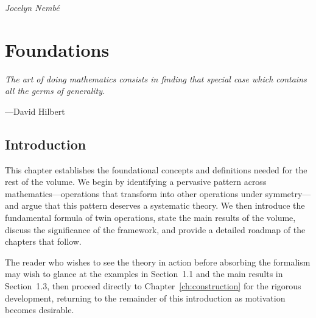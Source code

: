\documentclass[11pt,a4paper,openany]{book}
\theoremstyle{plain}
\theoremstyle{definition}
\begin{document}
\hfill\textit{Jocelyn Nembé}

\vspace{2em}

\part{Foundations}
\label{part:foundations}

\epigraph{\itshape The art of doing mathematics consists in finding that special case which contains all the germs of generality.}{---David Hilbert}


\chapter{Introduction}
\label{ch:introduction}

This chapter establishes the foundational concepts and definitions needed for the rest of the volume. We begin by identifying a pervasive pattern across mathematics---operations that transform into other operations under symmetry---and argue that this pattern deserves a systematic theory. We then introduce the fundamental formula of twin operations, state the main results of the volume, discuss the significance of the framework, and provide a detailed roadmap of the chapters that follow.

The reader who wishes to see the theory in action before absorbing the formalism may wish to glance at the examples in Section~1.1 and the main results in Section~1.3, then proceed directly to Chapter~\ref{ch:construction} for the rigorous development, returning to the remainder of this introduction as motivation becomes desirable.
\end{document}
